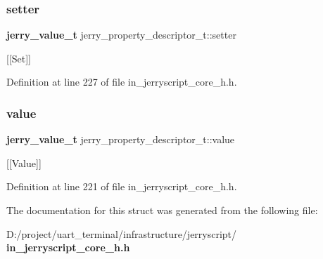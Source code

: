 \subsubsection{setter}
{\footnotesize\ttfamily \textbf{ jerry\+\_\+value\+\_\+t} jerry\+\_\+property\+\_\+descriptor\+\_\+t\+::setter}

[[Set]] 

Definition at line 227 of file in\+\_\+jerryscript\+\_\+core\+\_\+h.\+h.

\mbox{\label{structjerry__property__descriptor__t_ac334f1e12797986206b333b7eb51d040}} 
\subsubsection{value}
{\footnotesize\ttfamily \textbf{ jerry\+\_\+value\+\_\+t} jerry\+\_\+property\+\_\+descriptor\+\_\+t\+::value}

[[Value]] 

Definition at line 221 of file in\+\_\+jerryscript\+\_\+core\+\_\+h.\+h.



The documentation for this struct was generated from the following file\+:\begin{DoxyCompactItemize}
\item 
D\+:/project/uart\+\_\+terminal/infrastructure/jerryscript/\textbf{ in\+\_\+jerryscript\+\_\+core\+\_\+h.\+h}\end{DoxyCompactItemize}

